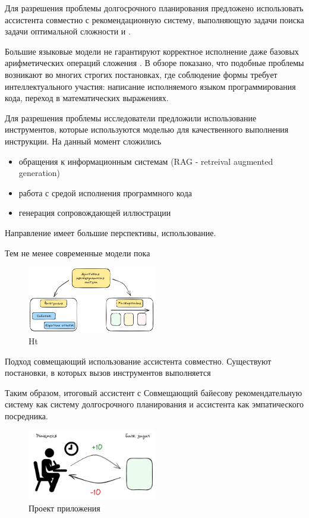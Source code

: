 
Для разрешения проблемы долгосрочного планирования предложено 
использовать ассистента совместно с рекомендационную систему,
выполняющую задачи поиска задачи оптимальной сложности и .

Большие языковые модели не гарантируют корректное исполнение даже базовых арифметических операций сложения . 
В обзоре \cite{zhao2023survey} показано, что подобные проблемы возникают во многих строгих постановках, где
соблюдение формы требует интеллектуального участия: написание исполняемого языком программирования кода,
переход в математических выражениях.

Для разрешения проблемы исследователи предложили использование инструментов,
которые используются моделью для качественного выполнения инструкции. На данный момент сложились \begin{itemize}
    \item обращения к информационным системам  (RAG - retreival augmented generation)\cite{lewis2020retrieval}
    \item работа с средой исполнения программного кода \cite{parisi2022talm}
    \item генерация сопровождающей иллюстрации
\end{itemize}

Направление имеет большие перспективы, использование.

Тем не менее современные модели пока 



\begin{figure}[h]
    \centering
    \includegraphics[width=0.5\textwidth]{assets/work/rating/bayes.excalidraw.png}
    \caption{Ht}
    \label{recommendation}
\end{figure}

Подход совмещающий использование ассистента совместно.
Существуют постановки, в которых вызов инструментов выполняется 

Таким образом, итоговый ассистент с
Совмещающий байесову рекомендательную систему как систему долгосрочного планирования и ассистента как эмпатического посредника.


\begin{figure}[h]
    \centering
    \includegraphics[width=0.5\textwidth]{assets/work/rating/recommendation.excalidraw.png}
    \caption{Проект приложения}
    \label{arch}
\end{figure}


